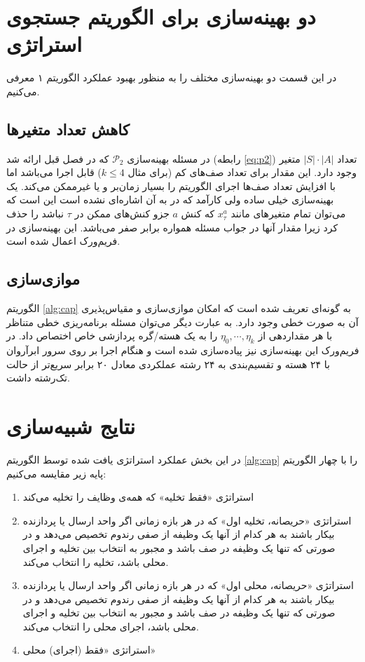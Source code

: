 \section{دو بهینه‌سازی برای الگوریتم جستجوی استراتژی}
در این قسمت دو بهینه‌سازی مختلف را به منظور بهبود عملکرد الگوریتم ۱ معرفی می‌کنیم.

\subsection{کاهش تعداد متغیرها}
در مسئله بهینه‌سازی 
$\mathcal{P}_2$
که در فصل قبل ارائه شد (رابطه \ref{eq:p2})  تعداد 
$|S| \cdot |A|$
متغیر وجود دارد. این مقدار برای تعداد صف‌های کم (برای مثال $k \leq 4$) قابل اجرا می‌باشد اما با افزایش تعداد صف‌ها اجرای الگوریتم را بسیار زمان‌بر و یا غیرممکن می‌کند. یک بهینه‌سازی خیلی ساده ولی کارآمد که در \cite{Liu} به آن اشاره‌ای نشده است این است که می‌توان تمام متغیرهای مانند
$x_{\tau}^{a}$
که کنش
$a$
جزو کنش‌های ممکن در
$\tau$
نباشد را حذف کرد زیرا مقدار آنها در جواب مسئله همواره برابر صفر می‌باشد. این بهینه‌سازی در فریم‌ورک  اعمال شده است.

\subsection{موازی‌سازی}
الگوریتم \ref{alg:cap} به گونه‌ای تعریف شده است که امکان موازی‌سازی و مقیاس‌پذیری آن به صورت خطی وجود دارد. به عبارت دیگر می‌توان مسئله برنامه‌ریزی خطی متناظر با هر مقداردهی از
$\eta_0, \cdots, \eta_k$
را به یک هسته/گره پردازشی خاص اختصاص داد. در فریم‌ورک  این بهینه‌سازی نیز پیاده‌سازی شده است و هنگام اجرا بر روی سرور ابرآروان با ۲۴ هسته و تقسیم‌بندی به ۲۴ رشته عملکردی معادل ۲۰ برابر سریع‌تر از حالت تک‌رشته داشت.
\newpage
\section{نتایج شبیه‌سازی}
در این بخش عملکرد استراتژی یافت شده توسط الگوریتم \ref{alg:cap} را با چهار الگوریتم پایه زیر مقایسه می‌کنیم:
\begin{enumerate}
	\item استراتژی «فقط تخلیه» که همه‌ی وظایف را تخلیه می‌کند
	\item استراتژی «حریصانه، تخلیه اول» که در هر بازه زمانی اگر واحد ارسال یا پردازنده بیکار باشند به هر کدام از آنها یک وظیفه از صفی رندوم تخصیص می‌دهد و در صورتی که تنها یک وظیفه در صف باشد و مجبور به انتخاب بین تخلیه و اجرای محلی باشد، تخلیه را انتخاب می‌کند.
	\item استراتژی «حریصانه، محلی اول» که در هر بازه زمانی اگر واحد ارسال یا پردازنده بیکار باشند به هر کدام از آنها یک وظیفه از صفی رندوم تخصیص می‌دهد و در صورتی که تنها یک وظیفه در صف باشد و مجبور به انتخاب بین تخلیه و اجرای محلی باشد، اجرای محلی را انتخاب می‌کند.
	\item استراتژی «فقط (اجرای) محلی»
\end{enumerate}
\newpage
